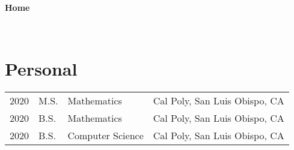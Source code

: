 \documentclass[11pt]{article}
\begin{document}
~
~

\begin{center}
  {
	\fontsize{1.5cm}{1.5cm}
        \textcolor{CalPolyGreen}{\textbf{Home}}
  }

\end{center}

~
~


\section*{\textcolor{CalPolyGreen}{Personal}}
\begin{tabular}{llll}
        2020    & M.S.  & Mathematics           & Cal Poly, San Luis Obispo, CA \\
        2020    & B.S.  & Mathematics           & Cal Poly, San Luis Obispo, CA \\
        2020    & B.S.  & Computer Science      & Cal Poly, San Luis Obispo, CA \\
\end{tabular}
\end{document}
